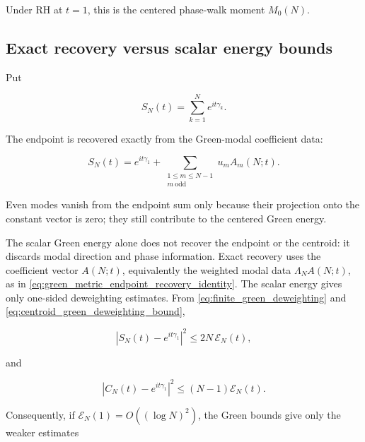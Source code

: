 \documentclass[11pt]{amsart}
\numberwithin{equation}{section}
\theoremstyle{plain}
\theoremstyle{definition}
\theoremstyle{remark}
\begin{document}
Under RH at \(t=1\), this is the centered phase-walk moment \(M_0(N)\).

\subsection{Exact recovery versus scalar energy bounds}
\label{subsec:conclusion_exact_recovery_scalar_bounds}
\leavevmode\par\nobreak

Put

\begin{equation}
S_N(t)
=
\sum_{k=1}^{N}e^{it\gamma_k}.
\label{eq:conclusion_t_deformed_endpoint}
\end{equation}

The endpoint is recovered exactly from the Green-modal coefficient data:

\begin{equation}
S_N(t)
=
e^{it\gamma_1}
+
\sum_{\substack{1\le m\le N-1\\ m\ \mathrm{odd}}}
u_mA_m(N;t).
\label{eq:conclusion_endpoint_projection}
\end{equation}

Even modes vanish from the endpoint sum only because their projection
onto the constant vector is zero; they still contribute to the centered
Green energy.

The scalar Green energy alone does not recover the endpoint or the
centroid: it discards modal direction and phase information. Exact
recovery uses the coefficient vector \(A(N;t)\), equivalently the
weighted modal data \(\Lambda_NA(N;t)\), as in
\eqref{eq:green_metric_endpoint_recovery_identity}. The scalar energy
gives only one-sided deweighting estimates. From
\eqref{eq:finite_green_deweighting} and
\eqref{eq:centroid_green_deweighting_bound},

\begin{equation}
\left|S_N(t)-e^{it\gamma_1}\right|^2
\le
2N\,\mathcal E_N(t),
\label{eq:conclusion_endpoint_weak_green_bound}
\end{equation}

and

\begin{equation}
\left|C_N(t)-e^{it\gamma_1}\right|^2
\le
(N-1)\mathcal E_N(t).
\label{eq:conclusion_centroid_weak_green_bound}
\end{equation}

Consequently, if \(\mathcal E_N(1)=O((\log N)^2)\), the Green bounds give
only the weaker estimates
\end{document}

